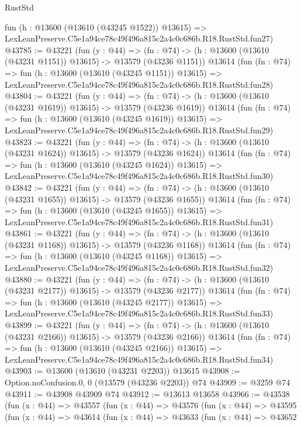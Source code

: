 \begin{lexlean}{RustStd}
\begin{coremodule}
    fun (h : @13600 (@13610 (@43245 @1522)) @13615) =>
    LexLeanPreserve.C5e1a94ce78c49f496a815c2a4c0c686b.R18.RustStd.fun27)
@43785 := @43221
    (fun (y : @44) =>
    (fn : @74) -> (h : @13600 (@13610 (@43231 @1151)) @13615) -> @13579 (@43236 @1151))
    @13614
    (fun (fn : @74) =>
    fun (h : @13600 (@13610 (@43245 @1151)) @13615) =>
    LexLeanPreserve.C5e1a94ce78c49f496a815c2a4c0c686b.R18.RustStd.fun28)
@43804 := @43221
    (fun (y : @44) =>
    (fn : @74) -> (h : @13600 (@13610 (@43231 @1619)) @13615) -> @13579 (@43236 @1619))
    @13614
    (fun (fn : @74) =>
    fun (h : @13600 (@13610 (@43245 @1619)) @13615) =>
    LexLeanPreserve.C5e1a94ce78c49f496a815c2a4c0c686b.R18.RustStd.fun29)
@43823 := @43221
    (fun (y : @44) =>
    (fn : @74) -> (h : @13600 (@13610 (@43231 @1624)) @13615) -> @13579 (@43236 @1624))
    @13614
    (fun (fn : @74) =>
    fun (h : @13600 (@13610 (@43245 @1624)) @13615) =>
    LexLeanPreserve.C5e1a94ce78c49f496a815c2a4c0c686b.R18.RustStd.fun30)
@43842 := @43221
    (fun (y : @44) =>
    (fn : @74) -> (h : @13600 (@13610 (@43231 @1655)) @13615) -> @13579 (@43236 @1655))
    @13614
    (fun (fn : @74) =>
    fun (h : @13600 (@13610 (@43245 @1655)) @13615) =>
    LexLeanPreserve.C5e1a94ce78c49f496a815c2a4c0c686b.R18.RustStd.fun31)
@43861 := @43221
    (fun (y : @44) =>
    (fn : @74) -> (h : @13600 (@13610 (@43231 @1168)) @13615) -> @13579 (@43236 @1168))
    @13614
    (fun (fn : @74) =>
    fun (h : @13600 (@13610 (@43245 @1168)) @13615) =>
    LexLeanPreserve.C5e1a94ce78c49f496a815c2a4c0c686b.R18.RustStd.fun32)
@43880 := @43221
    (fun (y : @44) =>
    (fn : @74) -> (h : @13600 (@13610 (@43231 @2177)) @13615) -> @13579 (@43236 @2177))
    @13614
    (fun (fn : @74) =>
    fun (h : @13600 (@13610 (@43245 @2177)) @13615) =>
    LexLeanPreserve.C5e1a94ce78c49f496a815c2a4c0c686b.R18.RustStd.fun33)
@43899 := @43221
    (fun (y : @44) =>
    (fn : @74) -> (h : @13600 (@13610 (@43231 @2166)) @13615) -> @13579 (@43236 @2166))
    @13614
    (fun (fn : @74) =>
    fun (h : @13600 (@13610 (@43245 @2166)) @13615) =>
    LexLeanPreserve.C5e1a94ce78c49f496a815c2a4c0c686b.R18.RustStd.fun34)
@43903 := @13600 (@13610 (@43231 @2203)) @13615
@43908 := Option.noConfusion.{0, 0} (@13579 (@43236 @2203)) @74
@43909 := @3259 @74
@43911 := @43908 @43909 @74
@43912 := @13613 @13658
@43966 := @43538
    (fun (x : @44) =>
    @43557
      (fun (x : @44) =>
      @43576
        (fun (x : @44) =>
        @43595
          (fun (x : @44) =>
          @43614
            (fun (x : @44) =>
            @43633
              (fun (x : @44) =>
              @43652

\end{coremodule}
\end{lexlean}
